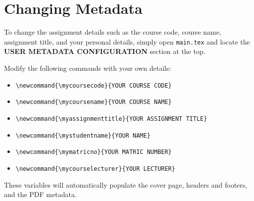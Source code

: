 \section{Changing Metadata}

To change the assignment details such as the course code, course name, assignment title, and your personal details, simply open \texttt{main.tex} and locate the \textbf{USER METADATA CONFIGURATION} section at the top. 

Modify the following commands with your own details:
\begin{itemize}
    \item \verb|\newcommand{\mycoursecode}{YOUR COURSE CODE}|
    \item \verb|\newcommand{\mycoursename}{YOUR COURSE NAME}|
    \item \verb|\newcommand{\myassignmenttitle}{YOUR ASSIGNMENT TITLE}|
    \item \verb|\newcommand{\mystudentname}{YOUR NAME}|
    \item \verb|\newcommand{\mymatricno}{YOUR MATRIC NUMBER}|
    \item \verb|\newcommand{\mycourselecturer}{YOUR LECTURER}|
\end{itemize}

These variables will automatically populate the cover page, headers and footers, and the PDF metadata.

\newpage